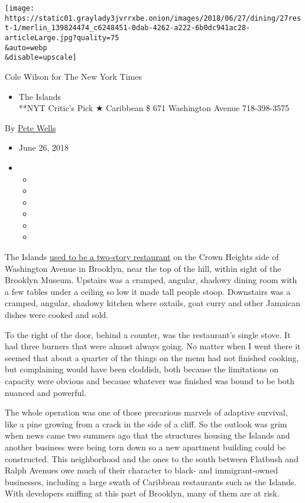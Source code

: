 \texttt{[image: https://static01.graylady3jvrrxbe.onion/images/2018/06/27/dining/27rest-1/merlin\_139824474\_c6248451-0dab-4262-a222-6b0dc941ac28-articleLarge.jpg?quality=75\\\&auto=webp\\\&disable=upscale]}

Cole Wilson for The New York Times

\begin{itemize}
\tightlist
\item
  The Islands\\
  **NYT Critic's Pick ★ Caribbean \$ 671 Washington Avenue 718-398-3575
\end{itemize}

By \href{https://www.nytimes3xbfgragh.onion/by/pete-wells}{Pete Wells}

\begin{itemize}
\item
  June 26, 2018
\item
  \begin{itemize}
  \item
  \item
  \item
  \item
  \item
  \item
  \end{itemize}
\end{itemize}

The Islands
\href{https://www.nytimes3xbfgragh.onion/2005/06/01/dining/reviews/in-brooklyn-a-breath-of-the-tropics.html}{used
to be a two-story restaurant} on the Crown Heights side of Washington
Avenue in Brooklyn, near the top of the hill, within sight of the
Brooklyn Museum. Upstairs was a cramped, angular, shadowy dining room
with a few tables under a ceiling so low it made tall people stoop.
Downstairs was a cramped, angular, shadowy kitchen where oxtails, goat
curry and other Jamaican dishes were cooked and sold.

To the right of the door, behind a counter, was the restaurant's single
stove. It had three burners that were almost always going. No matter
when I went there it seemed that about a quarter of the things on the
menu had not finished cooking, but complaining would have been cloddish,
both because the limitations on capacity were obvious and because
whatever was finished was bound to be both nuanced and powerful.

The whole operation was one of those precarious marvels of adaptive
survival, like a pine growing from a crack in the side of a cliff. So
the outlook was grim when news came two summers ago that the structures
housing the Islands and another business were being torn down so a new
apartment building could be constructed. This neighborhood and the ones
to the south between Flatbush and Ralph Avenues owe much of their
character to black- and immigrant-owned businesses, including a large
swath of Caribbean restaurants such as the Islands. With developers
sniffing at this part of Brooklyn, many of them are at risk.

